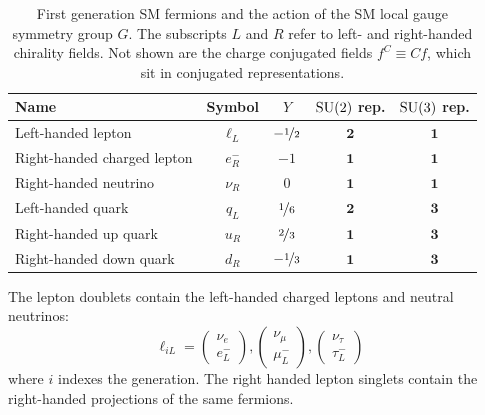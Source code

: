 \begin{table}[]
\begin{center}
    \caption{First generation SM fermions and the action of the SM local gauge symmetry group $G$.
             The subscripts $L$ and $R$ refer to left- and right-handed chirality fields.
             Not shown are the charge conjugated fields $f^C \equiv Cf$, which sit in conjugated representations.}
    \label{tab:theory:fermions}
    \begin{tabular}{l|c|c|c|c}
                Name & Symbol       & $Y$ & $\operatorname{\mathrm{SU}}(2)$ rep. & $\operatorname{\mathrm{SU}}(3)$ rep. \\
                \hline \hline
  Left-handed lepton & $\ell_L$     & $-\nicefrac{1}{2}$  & $\mathbf{2}$  & $\mathbf{1}$ \\  
 Right-handed charged lepton & $e_R^-$   & $-1$  & $\mathbf{1}$  & $\mathbf{1}$ \\  
 Right-handed neutrino & $\nu_R$   & $0$  & $\mathbf{1}$  & $\mathbf{1}$ \\  \hline
  Left-handed quark  & $q  _L$     & $\nicefrac{1}{6}$  & $\mathbf{2}$  & $\mathbf{3}$ \\  
 Right-handed up quark  & $u  _R$     & $\nicefrac{2}{3}$  & $\mathbf{1}$  & $\mathbf{3}$ \\ 
 Right-handed down quark  & $d  _R$     & $-\nicefrac{1}{3}$  & $\mathbf{1}$  & $\mathbf{3}$ \\  
    \end{tabular}
\end{center}
\end{table}

The lepton doublets contain the left-handed charged leptons and neutral neutrinos:
\begin{equation}
    \ell_{iL} = 
    \left(\begin{matrix} \nu_e \\ e_L^- \end{matrix}\right),
    \left(\begin{matrix} \nu_\mu \\ \mu_L^- \end{matrix}\right),
    \left(\begin{matrix} \nu_\tau \\ \tau_L^- \end{matrix}\right)
\end{equation}
where $i$ indexes the generation.
The right handed lepton singlets contain the right-handed projections of the same fermions.

